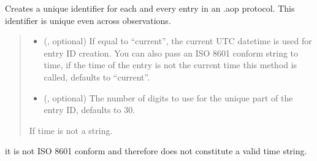 \documentclass[letterpaper,10pt,english]{sphinxmanual}
\begin{document}

\begin{fulllineitems}
\label{\detokenize{autoapi/aop/aop/index:aop.aop.create_entry_id}}
\pysigstartsignatures
{}
\pysigstopsignatures
\sphinxAtStartPar
Creates a unique identifier for each and every entry in an .aop protocol.
This identifier is unique even across observations.
\begin{quote}\begin{description}
\begin{itemize}
\item {} 
\sphinxAtStartPar
{} (, optional) \textendash{} If equal to “current”, the current UTC datetime is used for
entry ID creation. You can also pass an ISO 8601 conform string to
time, if the time of the entry is not the current time this method is
called, defaults to “current”.

\item {} 
\sphinxAtStartPar
{} (, optional) \textendash{} The number of digits to use for the unique part of the entry ID, defaults to 30.

\end{itemize}

\sphinxAtStartPar
{} \textendash{} If time is not a string.

\end{description}\end{quote}
\begin{description}
\sphinxAtStartPar
it is not ISO 8601 conform and therefore does not constitute a valid time string.


\end{description}
\end{fulllineitems}
\end{document}
